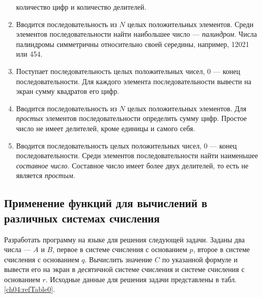 \begin{enumerate}
количество цифр и количество делителей.
\item Вводится последовательность из $N$ целых положительных элементов. Среди элементов последовательности найти
наибольшее число --- \emph{палиндром}. Числа палиндромы симметричны относительно своей середины, например,
12021 или 454.
\item Поступает последовательность целых положительных чисел, 0 --- конец последовательности. Для каждого элемента
последовательности вывести на экран сумму квадратов его цифр.
\item Вводится последовательность из $N$ целых положительных элементов. Для \emph{простых} элементов
последовательности определить сумму цифр. Простое число не имеет делителей, кроме единицы и самого себя.
\item Вводится последовательность целых положительных чисел, 0 --- конец последовательности. Среди элементов
последовательности найти наименьшее \emph{составное число}. Составное число имеет более двух делителей, то
есть не является \emph{простым}.
\end{enumerate}

\subsection[Применение функций для вычислений в различных системах счисления]{Применение функций для вычислений в
различных системах счисления}
Разработать программу на языке  для решения следующей задачи. Заданы два числа --- $A$ и
$B$, первое в системе счисления с основанием $p$, второе в системе счисления с
основанием $q$. Вычислить значение $C$ по указанной формуле и вывести его на экран
в десятичной системе счисления и системе счисления с основанием $r$. Исходные данные для решения
задачи представлены в табл. \ref{ch04:refTable0}.

